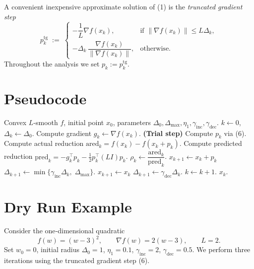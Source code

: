 \documentclass{article}
\newcommand{\norm}[1]{\left\lVert#1\right\rVert}
\begin{document}
A convenient inexpensive approximate solution of (1) is the \emph{truncated gradient step}
\[
p_k^{\text{tg}} \;:=\; 
\begin{cases}
-\dfrac{1}{L}\nabla f(x_k), & \text{if }\norm{\nabla f(x_k)}\le L\Delta_k,\\[6pt]
-\Delta_k\,\dfrac{\nabla f(x_k)}{\norm{\nabla f(x_k)}}, & \text{otherwise}.
\end{cases}
\tag{6}
\]
Throughout the analysis we set $p_k:=p_k^{\text{tg}}$.

\section*{Pseudocode}
\begin{algorithm}[H]
\caption{Trust‑Region Gradient Method (TR‑GM)}\label{alg:trgm}
\begin{algorithmic}[1]
\Require Convex $L$‑smooth $f$, initial point $x_0$, parameters 
$\Delta_0,\Delta_{\max},\eta_1,\gamma_{\text{inc}},\gamma_{\text{dec}}$.
\State $k\gets0$, $\Delta_k\gets\Delta_0$.
    \State Compute gradient $g_k\gets\nabla f(x_k)$.
    \State \textbf{(Trial step)} Compute $p_k$ via (6).
    \State Compute actual reduction $\text{ared}_k = f(x_k)-f(x_k+p_k)$.
    \State Compute predicted reduction $\text{pred}_k = -g_k^{\top}p_k-\frac12 p_k^{\top}(L I)p_k$.
    \State $\rho_k\gets \dfrac{\text{ared}_k}{\text{pred}_k}$.
        \State $x_{k+1}\gets x_k+p_k$ 
        \State $\Delta_{k+1}\gets \min\{\gamma_{\text{inc}}\Delta_k,\;\Delta_{\max}\}$.
    \Else
        \State $x_{k+1}\gets x_k$ 
        \State $\Delta_{k+1}\gets \gamma_{\text{dec}}\Delta_k$.
    \EndIf
    \State $k\gets k+1$.
\EndWhile
\State \Return $x_k$.
\end{algorithmic}
\end{algorithm}

\section*{Dry Run Example}
Consider the one‑dimensional quadratic
\[
f(w) = (w-3)^2,\qquad \nabla f(w)=2(w-3),\qquad L=2.
\]
Set $w_0=0$, initial radius $\Delta_0=1$, $\eta_1=0.1$, $\gamma_{\text{inc}}=2$, $\gamma_{\text{dec}}=0.5$.
We perform three iterations using the truncated gradient step (6).
\end{document}
